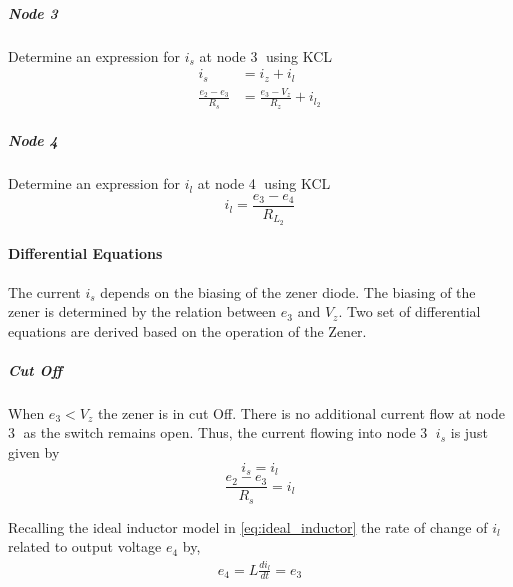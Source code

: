 \subparagraph{Node \textcircled{3}}
Determine an expression for $i_s$ at node \textcircled{3} using KCL
\begin{equation}
	\begin{split}
		i_s &= i_z + i_l \\
		\frac{e_2 - e_3}{R_s} &= \frac{e_3 - V_z}{R_z} + i_{l_2}
	\end{split}
	\label{eq:inductiveLoad_node3}
\end{equation}

\subparagraph{Node \textcircled{4}}
Determine an expression for $i_l$ at node \textcircled{4} using KCL
\begin{equation}
	i_l = \frac{e_3 - e_4}{R_{L_2}}
	\label{eq:inductiveLoad_node4}
\end{equation}
\paragraph{Differential Equations}
The current $i_s$ depends on the biasing of the zener diode. The biasing of the zener is determined by the relation between $e_3$ and $V_z$. Two set of differential equations are derived based on the operation of the Zener.

\subparagraph{Cut Off}
When $e_3 < V_z$ the zener is in cut Off. There is no additional current flow at node \textcircled{3} as the switch remains open. Thus, the current flowing into node \textcircled{3} $i_s$ is just given by $$i_s = i_l$$
\begin{equation}
	\frac{e_2 - e_3}{R_s} = i_l
	\label{eq:inductiveload_il}
\end{equation}

Recalling the ideal inductor model in \eqref{eq:ideal_inductor} the rate of change of $i_{l}$ related to output voltage $e_4$ by,
\begin{equation}
	\begin{split}
		e_4 = L\frac{di_l}{dt} = e_3
	\end{split}
	\label{eq:inductiveLoad_output}
\end{equation}

